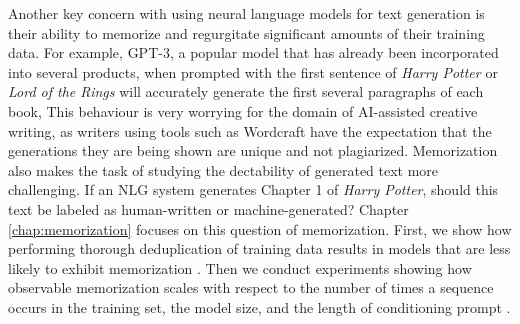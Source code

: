 Another key concern with using neural language models for text generation is their ability to memorize and regurgitate significant amounts of their training data.
For example, GPT-3, a popular model that has already been incorporated into several products, when prompted with the first sentence of \textit{Harry Potter} or \textit{Lord of the Rings} will accurately generate the first several paragraphs of each book,
This behaviour is very worrying for the domain of AI-assisted creative writing, as writers using tools such as Wordcraft have the expectation that the generations they are being shown are unique and not plagiarized.
Memorization also makes the task of studying the dectability of generated text more challenging.
If an NLG system generates Chapter 1 of \textit{Harry Potter}, should this text be labeled as human-written or machine-generated?
Chapter \ref{chap:memorization} focuses on this question of memorization.
First, we show how performing thorough deduplication of training data results in models that are less likely to exhibit memorization .
Then we conduct experiments showing how observable memorization scales with respect to the number of times a sequence occurs in the training set, the model size, and the length of conditioning prompt .



